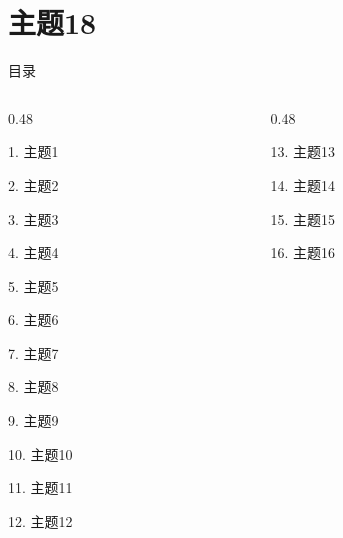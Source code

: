 \documentclass[aspectratio=169,10pt,fontset=fandol]{ctexbeamer}
\begin{document}
\section{主题18}
\begin{frame}[t,fragile]{目录}
\small
\begin{columns}[T,onlytextwidth]
\begin{column}{0.48\textwidth}
{\color{black}\small 1. 主题1\par}\vspace{0.22em}
{\color{black}\small 2. 主题2\par}\vspace{0.22em}
{\color{black}\small 3. 主题3\par}\vspace{0.22em}
{\color{black}\small 4. 主题4\par}\vspace{0.22em}
{\color{black}\small 5. 主题5\par}\vspace{0.22em}
{\color{black}\small 6. 主题6\par}\vspace{0.22em}
{\color{black}\small 7. 主题7\par}\vspace{0.22em}
{\color{black}\small 8. 主题8\par}\vspace{0.22em}
{\color{black}\small 9. 主题9\par}\vspace{0.22em}
{\color{black}\small 10. 主题10\par}\vspace{0.22em}
{\color{black}\small 11. 主题11\par}\vspace{0.22em}
{\color{black}\small 12. 主题12\par}\vspace{0.22em}
\end{column}
\begin{column}{0.48\textwidth}
{\color{black}\small 13. 主题13\par}\vspace{0.22em}
{\color{black}\small 14. 主题14\par}\vspace{0.22em}
{\color{black}\small 15. 主题15\par}\vspace{0.22em}
{\color{black}\small 16. 主题16\par}\vspace{0.22em}

\end{column}
\end{columns}
\end{frame}
\end{document}
